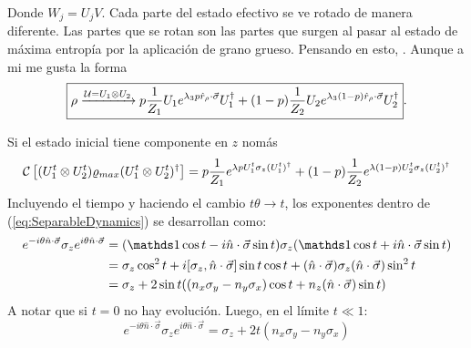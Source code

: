 Donde $W_{j}=U_{j}V$. Cada parte del estado efectivo se ve rotado de manera diferente. Las partes que se rotan son las partes que surgen al pasar al estado de máxima entropía por la aplicación de grano grueso. Pensando en esto, . Aunque a mi me gusta la forma
\begin{equation}\label{eq:SeparableDynamics}
    \boxed{\rho\xrightarrow{\mathcal{U}=U_{1}\otimes U_{2}} p\frac{1}{Z_{1}}U_{1}e^{\lambda_{3}p\hat{r}_{\rho}\cdot\vec{\sigma}}U_{1}^{\dag}+(1-p)\frac{1}{Z_{2}}U_{2}e^{\lambda_{3}(1-p)\hat{r}_{\rho}\cdot\vec{\sigma}}U_{2}^{\dag}}.
\end{equation}

Si el estado inicial tiene componente en $z$ nomás
\begin{equation}\label{eq:SeparableZDynamics}
\mathcal{C}\left[(U_{1}^{t}\otimes U_{2}^{t})\varrho_{max}(U_{1}^{t}\otimes U_{2}^{t})^{\dag}\right]=p\frac{1}{Z_{1}}e^{\lambda p U_{1}^{t}\sigma_{z}(U_{1}^t)^{\dag}}+(1-p)\frac{1}{Z_{2}}e^{\lambda (1-p)U_{2}^{t}\sigma_{z}(U_{2}^t)^{\dag}}
\end{equation}
Incluyendo el tiempo y haciendo el cambio $t\theta\rightarrow t$, los exponentes dentro de (\ref{eq:SeparableDynamics}) se desarrollan como:
\begin{align*}
    e^{-i\theta \hat{n}\cdot\vec{\sigma}}\sigma_{z}e^{i\theta \hat{n}\cdot\vec{\sigma}}&=(\Id\cos{t}-i\hat{n}\cdot\vec{\sigma}\sin{t})\sigma_{z}(\Id\cos{t}+i\hat{n}\cdot\vec{\sigma}\sin{t})\\
    &=\sigma_{z}\cos^{2}{t}+i[\sigma_{z},\hat{n}\cdot\vec{\sigma}]\sin{t}\cos{t}+(\hat{n}\cdot\vec{\sigma})\sigma_{z}(\hat{n}\cdot\vec{\sigma})\sin^{2}{t}\\
    &=\sigma_{z}+2\sin{t}\qty((n_{x}\sigma_{y}-n_{y}\sigma_{x})\cos{t}+n_{z}(\hat{n}\cdot\vec{\sigma})\sin{t})
\end{align*}
A notar que si $t=0$ no hay evolución. Luego, en el límite $t\ll 1$:
\begin{equation*}
    e^{-i\theta \hat{n}\cdot\vec{\sigma}}\sigma_{z}e^{i\theta \hat{n}\cdot\vec{\sigma}}=\sigma_{z}+2t(n_{x}\sigma_{y}-n_{y}\sigma_{x})
\end{equation*}

